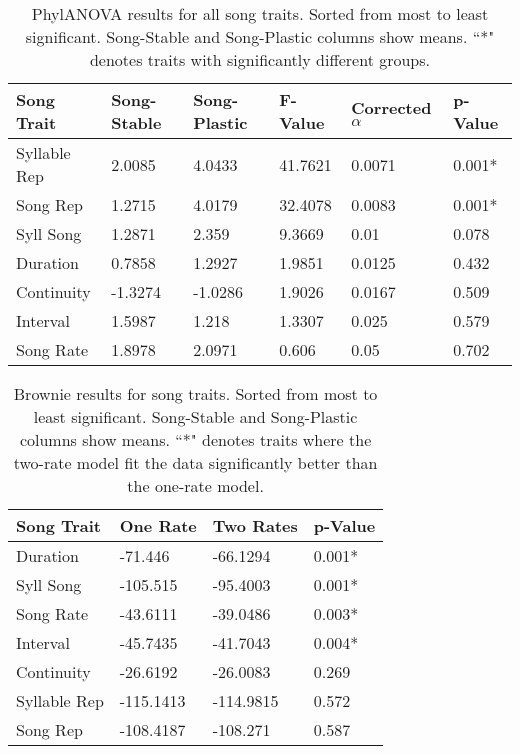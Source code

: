 \documentclass[a4paper,12pt]{article}
\begin{document}
\newcommand{\beginsupplement}{%
        \setcounter{table}{0}
        \renewcommand{\thetable}{S\arabic{table}}%
        \setcounter{figure}{0}
        \renewcommand{\thefigure}{S\arabic{figure}}%
     }
    
\begin{table}[ht]
\caption{PhylANOVA results for all song traits.  Sorted from most to least significant.  Song-Stable and Song-Plastic columns show means.  ``*" denotes traits with significantly different groups.}
\centering
\begin{tabular}{llllll}
  \hline
Song Trait & Song-Stable & Song-Plastic & F-Value & Corrected $\alpha$ & p-Value \\ 
  \hline
Syllable Rep & 2.0085 & 4.0433 & 41.7621 & 0.0071 & 0.001* \\ 
  Song Rep & 1.2715 & 4.0179 & 32.4078 & 0.0083 & 0.001* \\ 
  Syll Song & 1.2871 & 2.359 & 9.3669 & 0.01 & 0.078 \\ 
  Duration & 0.7858 & 1.2927 & 1.9851 & 0.0125 & 0.432 \\ 
  Continuity & -1.3274 & -1.0286 & 1.9026 & 0.0167 & 0.509 \\ 
  Interval & 1.5987 & 1.218 & 1.3307 & 0.025 & 0.579 \\ 
  Song Rate & 1.8978 & 2.0971 & 0.606 & 0.05 & 0.702 \\ 
   \hline
\end{tabular}
\end{table}


\begin{table}[ht]
\caption{Brownie results for song traits.  Sorted from most to least significant.  Song-Stable and Song-Plastic columns show means.  ``*" denotes traits where the two-rate model fit the data significantly better than the one-rate model.}
\centering
\begin{tabular}{llll}
  \hline
Song Trait & One Rate & Two Rates & p-Value \\ 
  \hline
Duration & -71.446 & -66.1294 & 0.001* \\ 
  Syll Song & -105.515 & -95.4003 & 0.001* \\ 
  Song Rate & -43.6111 & -39.0486 & 0.003* \\ 
  Interval & -45.7435 & -41.7043 & 0.004* \\ 
  Continuity & -26.6192 & -26.0083 & 0.269 \\ 
  Syllable Rep & -115.1413 & -114.9815 & 0.572 \\ 
  Song Rep & -108.4187 & -108.271 & 0.587 \\ 
   \hline
\end{tabular}
\end{table}
\end{document}

